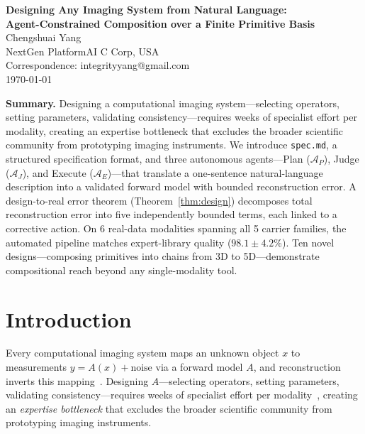 \documentclass[11pt,a4paper]{article}
\newcommand{\Agent}{\mathcal{A}}
\begin{document}
\begin{center}
{\LARGE\bfseries Designing Any Imaging System from Natural Language:\\[4pt]
Agent-Constrained Composition over a Finite Primitive Basis}\\[18pt]
{\large Chengshuai Yang}\\[6pt]
{\normalsize NextGen PlatformAI C Corp, USA}\\[6pt]
{\normalsize Correspondence: integrityyang@gmail.com}\\[12pt]
\today
\end{center}

\vspace{6pt}

\noindent\textbf{Summary.}
Designing a computational imaging system---selecting operators, setting parameters, validating consistency---requires weeks of specialist effort per modality, creating an expertise bottleneck that excludes the broader scientific community from prototyping imaging instruments.  We introduce \texttt{spec.md}, a structured specification format, and three autonomous agents---Plan ($\Agent_P$), Judge ($\Agent_J$), and Execute ($\Agent_E$)---that translate a one-sentence natural-language description into a validated forward model with bounded reconstruction error.  A design-to-real error theorem (Theorem~\ref{thm:design}) decomposes total reconstruction error into five independently bounded terms, each linked to a corrective action.  On 6 real-data modalities spanning all 5 carrier families, the automated pipeline matches expert-library quality ($98.1 \pm 4.2$\%).  Ten novel designs---composing primitives into chains from 3D to 5D---demonstrate compositional reach beyond any single-modality tool.

\section{Introduction}

Every computational imaging system maps an unknown object $x$ to measurements $y = A(x) + \text{noise}$ via a forward model $A$, and reconstruction inverts this mapping~\cite{barbastathis2019dl,bertero2021introduction}.  Designing $A$---selecting operators, setting parameters, validating consistency---requires weeks of specialist effort per modality~\cite{lustig2007sparse,yuan2021snapshot}, creating an \emph{expertise bottleneck} that excludes the broader scientific community from prototyping imaging instruments.
\end{document}
